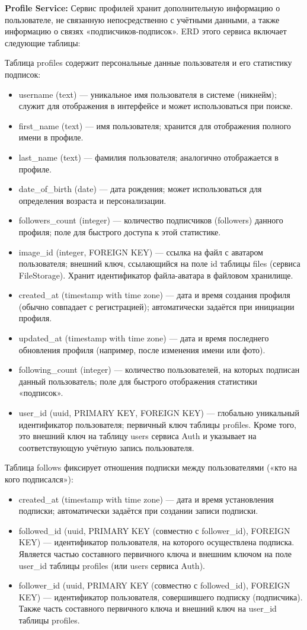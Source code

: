 \textbf{Profile Service:} Сервис профилей хранит дополнительную информацию о пользователе, не связанную непосредственно с учётными данными, а также информацию о связях «подписчиков-подписок». ERD этого сервиса включает следующие таблицы:

Таблица profiles содержит персональные данные пользователя и его статистику подписок:
\begin{itemize}
    \item username (text) — уникальное имя пользователя в системе (никнейм); служит для отображения в интерфейсе и может использоваться при поиске.
    \item first\_name (text) — имя пользователя; хранится для отображения полного имени в профиле.
    \item last\_name (text) — фамилия пользователя; аналогично отображается в профиле.
    \item date\_of\_birth (date) — дата рождения; может использоваться для определения возраста и персонализации.
    \item followers\_count (integer) — количество подписчиков (followers) данного профиля; поле для быстрого доступа к этой статистике.
    \item image\_id (integer, FOREIGN KEY) — ссылка на файл с аватаром пользователя; внешний ключ, ссылающийся на поле id таблицы files (сервиса FileStorage). Хранит идентификатор файла-аватара в файловом хранилище.
    \item created\_at (timestamp with time zone) — дата и время создания профиля (обычно совпадает с регистрацией); автоматически задаётся при инициации профиля.
    \item updated\_at (timestamp with time zone) — дата и время последнего обновления профиля (например, после изменения имени или фото).
    \item following\_count (integer) — количество пользователей, на которых подписан данный пользователь; поле для быстрого отображения статистики «подписок».
    \item user\_id (uuid, PRIMARY KEY, FOREIGN KEY) — глобально уникальный идентификатор пользователя; первичный ключ таблицы profiles. Кроме того, это внешний ключ на таблицу users сервиса Auth и указывает на соответствующую учётную запись пользователя.
\end{itemize}
Таблица follows фиксирует отношения подписки между пользователями («кто на кого подписался»):
\begin{itemize}
    \item created\_at (timestamp with time zone) — дата и время установления подписки; автоматически задаётся при создании записи подписки.
    \item followed\_id (uuid, PRIMARY KEY (совместно с follower\_id), FOREIGN KEY) — идентификатор пользователя, на которого осуществлена подписка. Является частью составного первичного ключа и внешним ключом на поле user\_id таблицы profiles (или users сервиса Auth).
    \item follower\_id (uuid, PRIMARY KEY (совместно с followed\_id), FOREIGN KEY) — идентификатор пользователя, совершившего подписку (подписчика). Также часть составного первичного ключа и внешний ключ на user\_id таблицы profiles.
\end{itemize}

